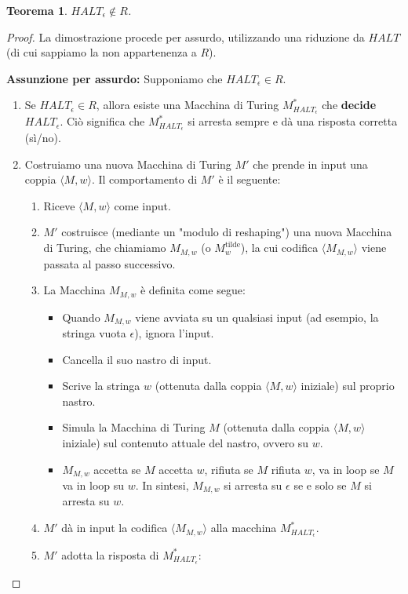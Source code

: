 \documentclass[a4paper, 11pt]{book} %
\newtheorem{theorem}{Teorema}[section]
\theoremstyle{definition}
\begin{document}
\begin{theorem}
$HALT_\epsilon \notin R$.
\end{theorem}
\begin{proof}
La dimostrazione procede per assurdo, utilizzando una riduzione da $HALT$ (di cui sappiamo la non appartenenza a $R$).

\textbf{Assunzione per assurdo:} Supponiamo che $HALT_\epsilon \in R$.
\begin{enumerate}
    \item Se $HALT_\epsilon \in R$, allora esiste una Macchina di Turing $M_{HALT_\epsilon}^*$ che \textbf{decide} $HALT_\epsilon$. Ciò significa che $M_{HALT_\epsilon}^*$ si arresta sempre e dà una risposta corretta (sì/no).
    \item Costruiamo una nuova Macchina di Turing $M'$ che prende in input una coppia $\langle M, w \rangle$. Il comportamento di $M'$ è il seguente:
    \begin{enumerate}
        \item Riceve $\langle M, w \rangle$ come input.
        \item $M'$ costruisce (mediante un "modulo di reshaping") una nuova Macchina di Turing, che chiamiamo $M_{M,w}$ (o $M_w^{\text{tilde}}$), la cui codifica $\langle M_{M,w} \rangle$ viene passata al passo successivo.
        \item La Macchina $M_{M,w}$ è definita come segue:
        \begin{itemize}
            \item Quando $M_{M,w}$ viene avviata su un qualsiasi input (ad esempio, la stringa vuota $\epsilon$), ignora l'input.
            \item Cancella il suo nastro di input.
            \item Scrive la stringa $w$ (ottenuta dalla coppia $\langle M, w \rangle$ iniziale) sul proprio nastro.
            \item Simula la Macchina di Turing $M$ (ottenuta dalla coppia $\langle M, w \rangle$ iniziale) sul contenuto attuale del nastro, ovvero su $w$.
            \item $M_{M,w}$ accetta se $M$ accetta $w$, rifiuta se $M$ rifiuta $w$, va in loop se $M$ va in loop su $w$. In sintesi, $M_{M,w}$ si arresta su $\epsilon$ se e solo se $M$ si arresta su $w$.
        \end{itemize}
        \item $M'$ dà in input la codifica $\langle M_{M,w} \rangle$ alla macchina $M_{HALT_\epsilon}^*$.
        \item $M'$ adotta la risposta di $M_{HALT_\epsilon}^*$:

\end{enumerate}
\end{enumerate}
\end{proof}
\end{document}
